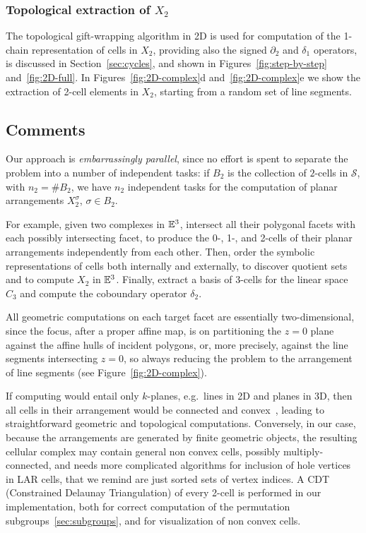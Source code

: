 \subsubsection{Topological extraction of $X_2$}
\label{sec:topo}
{The topological gift-wrapping algorithm in 2D is used for} computation of the 1-chain representation of cells in $X_2$, providing also the signed $\partial_2$ and $\delta_1$ operators, is discussed in Section~\ref{sec:cycles}, and shown in Figures~\ref{fig:step-by-step} and~\ref{fig:2D-full}. In Figures~\ref{fig:2D-complex}d and~\ref{fig:2D-complex}e we show the extraction of 2-cell elements in $X_2$, starting from a random set of line segments.


\subsection{Comments}

Our approach is \emph{embarrassingly parallel}, since no effort
is spent to separate the problem into a number of independent 
tasks: if $B_2$ is the collection of $2$-cells in $\mathcal{S}$, with $n_2=\#B_2$, we have
$n_2$ independent tasks for the computation of planar
arrangements $X_2^\sigma$, $\sigma \in B_2$.

For example, given two complexes in $\mathbb{E}^3$, intersect all their
polygonal facets with each possibly intersecting facet, to produce the 0-, 1-,  and 2-cells
of their planar arrangements independently from each other. Then, order the symbolic representations of cells both internally and externally, to discover quotient sets and to compute $X_2$ in $\mathbb{E}^3$. Finally, extract a basis of 3-cells for the linear space $C_3$ and compute the coboundary operator $\delta_2$. 

All geometric computations
on each target facet are essentially two-dimensional, since the focus,
after a proper affine map, is on partitioning the $z=0$ plane against the
affine hulls of incident polygons, or, more precisely, against the line segments intersecting $z=0$,
so always reducing the problem to the arrangement of line segments (see Figure~\ref{fig:2D-complex}).

If computing would entail only $k$-planes, e.g.~lines in
2D and planes in 3D, then all cells in their arrangement would be connected
and {convex~\cite{Ziegler:92}, leading} to straightforward geometric and topological
computations. Conversely, in our case, because the arrangements are generated by finite geometric objects, the
resulting cellular complex may contain general non convex cells, possibly multiply-connected, and needs
 more complicated algorithms for inclusion of hole vertices in LAR cells, that we remind are just sorted sets of vertex indices. 
{A CDT (Constrained Delaunay Triangulation) of every 2-cell is performed in our implementation,} both for correct computation of the permutation subgroups~\ref{sec:subgroups}, and for visualization of non convex cells. 


